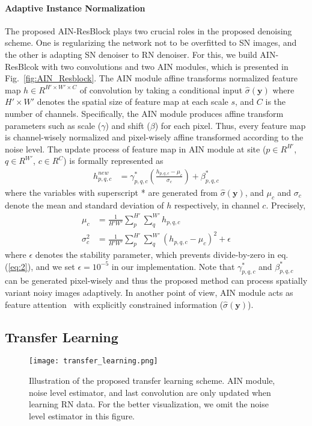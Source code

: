 \documentclass[10pt,twocolumn,letterpaper]{article}
\begin{document}
\paragraph{Adaptive Instance Normalization}
The proposed AIN-ResBlock plays two crucial roles in the proposed denoising scheme.
One is regularizing the network not to be overfitted to SN images, and the other is adapting SN denoiser to RN denoiser.
For this, we build AIN-ResBlcok with two convolutions and two AIN modules, which is presented in Fig.~\ref{fig:AIN_Resblock}. 
The AIN module affine transforms normalized feature map $h\in \!R^{H' \times W' \times C}$ of convolution by taking a conditional input $\hat{\sigma}(\textbf{y})$ where $H' \times W'$ denotes the spatial size of feature map at each scale $s$, and $C$ is the number of channels.
Specifically, the AIN module produces affine transform parameters such as scale ($\gamma$) and shift ($\beta$) for each pixel.
Thus, every feature map is channel-wisely normalized and pixel-wisely affine transformed according to the noise level.
The update process of feature map in AIN module at site ($p \in \!R^{H'}$, $q \in \!R^{W'}$, $c \in \!R^{C}$) is formally represented as
\begin{align}
h^{new}_{p,q,c} &= \gamma^*_{p,q,c} \left(\frac{h_{p,q,c}-\mu_c}{\sigma_c} \right) + \beta^*_{p,q,c}
\label{eq:2}
\end{align}
where the variables with superscript * are generated from $\hat{\sigma}(\textbf{y})$, and $\mu_c$ and $\sigma_c$ denote the mean and standard deviation of $h$ respectively, in channel $c$. Precisely,
\begin{align}
\mu_c &= \frac{1}{H'W'} \sum_{p}^{H'} \sum_{q}^{W'} h_{p,q,c} \\
\sigma_c^2 &= \frac{1}{H'W'} \sum_{p}^{H'} \sum_{q}^{W'}(h_{p,q,c} - \mu_c)^2 + \epsilon
\end{align}  
where $\epsilon$ denotes the stability parameter, which prevents divide-by-zero in eq. (\ref{eq:2}), and we set $\epsilon=10^{-5}$ in our implementation. Note that
$\gamma^*_{p,q,c}$ and $\beta^*_{p,q,c}$ can be generated pixel-wisely and thus the proposed method can process spatially variant noisy images adaptively. 
In another point of view, AIN module acts as feature attention~\cite{chen2017sca,zhang2018image,woo2018cbam, dai2019second,kim2020agarnet} with explicitly constrained information ($\hat{\sigma}(\textbf{y})$).


\subsection{Transfer Learning}
\begin{figure}[t]
	\centering				
	\texttt{[image: transfer\_learning.png]} 
	\caption{Illustration of the proposed transfer learning scheme. 
		AIN module, noise level estimator, and last convolution are only updated when learning RN data.
		For the better visualization, we omit the noise level estimator in this figure.}	
	\label{fig:transfer_learning}	
\end{figure}
\end{document}
